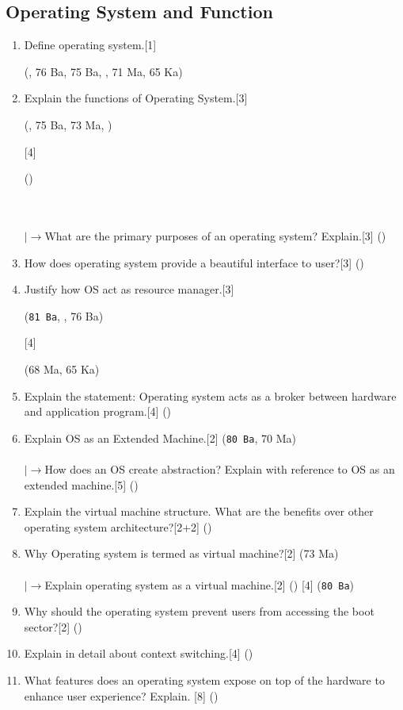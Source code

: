 \documentclass[12pt]{article}
\newcommand{\lb}{\\$\left|\rightarrow\right.$}
\begin{document}
	\subsection{Operating System and Function}
	\begin{enumerate}
	\item Define operating system.\hfill[1] \begin{footnotesize}(, 76 Ba, 75 Ba, , 71 Ma, 65 Ka)\end{footnotesize}
	\item Explain the functions of Operating System.\hfill[3] \begin{footnotesize}(, 75 Ba, 73 Ma, )\end{footnotesize} [4] \begin{footnotesize}()\end{footnotesize} \\
	\lb What are the primary purposes of an operating system? Explain.\hfill[3] ()
	\item How does operating system provide a beautiful interface to user?\hfill[3] ()
	\item Justify how OS act as resource manager.\hfill[3]\begin{small} (\texttt{81 Ba}, , 76 Ba)\end{small} [4]\begin{small} (68 Ma, 65 Ka)\end{small}
	\item Explain the statement: Operating system acts as a broker between hardware and application program.\hfill[4] ()
	\item Explain OS as an Extended Machine.\hfill[2] (\texttt{80 Ba}, 70 Ma)\\
	\lb How does an OS create abstraction? Explain with reference to OS as an extended machine.\hspace{13.4cm}[5] ()
	\item Explain the virtual machine structure. What are the benefits over other operating system architecture?\hfill[2+2] ()
	\item Why Operating system is termed as virtual machine?\hfill[2] (73 Ma)\\
	\lb Explain operating system as a virtual machine.\hfill[2] () [4] (\texttt{80 Ba})

	\item Why should the operating system prevent users from accessing the boot sector?\hfill[2] ()
	\item Explain in detail about context switching.\hfill[4] ()
	\item What features does an operating system expose on top of the hardware to enhance user experience? Explain. \hfill[8] ()
	\end{enumerate}
\end{document}
